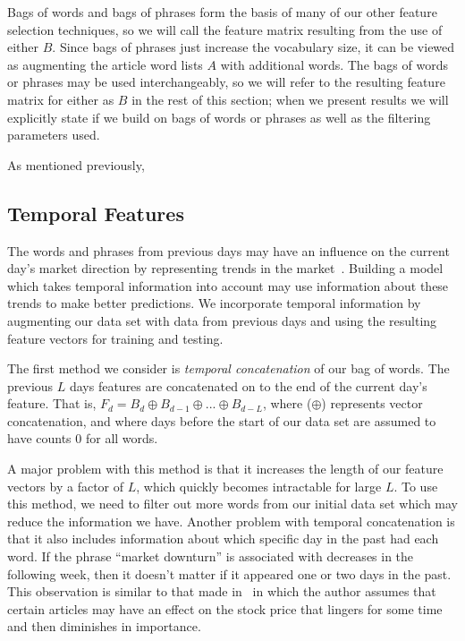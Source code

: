 \documentclass[10pt, twocolumn]{article}
\begin{document}
Bags of words and bags of phrases form the basis of many of our other feature selection techniques, so we will call the feature matrix resulting from the use of either $B$. Since bags of phrases just increase the vocabulary size, it can be viewed as augmenting the article word lists $A$ with additional words. The bags of words or phrases may be used interchangeably, so we will refer to the resulting feature matrix for either as $B$ in the rest of this section; when we present results we will explicitly state if we build on bags of words or phrases as well as the filtering parameters used.

As mentioned previously,

\subsection{Temporal Features}

The words and phrases from previous days may have an influence on the current day's market direction by representing trends in the market~\cite{mlstockmarket}. Building a model which takes temporal information into account may use information about these trends to make better predictions. We incorporate temporal information by augmenting our data set with data from previous days and using the resulting feature vectors for training and testing.

The first method we consider is \textit{temporal concatenation} of our bag of words. The previous $L$ days features are concatenated on to the end of the current day's feature. That is, $F_{d} = B_{d} \oplus B_{d-1} \oplus ... \oplus B_{d-L}$, where ($\oplus$) represents vector concatenation, and where days before the start of our data set are assumed to have counts $0$ for all words.

A major problem with this method is that it increases the length of our feature vectors by a factor of $L$, which quickly becomes intractable for large $L$. To use this method, we need to filter out more words from our initial data set which may reduce the information we have. Another problem with temporal concatenation is that it also includes information about which specific day in the past had each word. If the phrase ``market downturn'' is associated with decreases in the following week, then it doesn't matter if it appeared one or two days in the past. This observation is similar to that made in~\cite{mlstockmarket} in which the author assumes that certain articles may have an effect on the stock price that lingers for some time and then diminishes in importance. 
\end{document}
